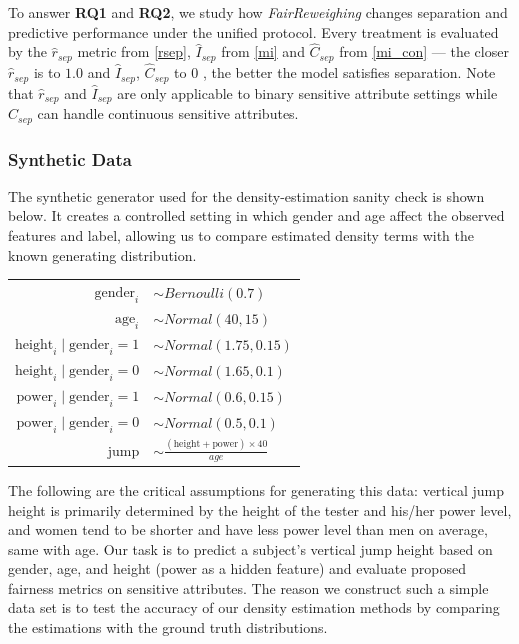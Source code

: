 To answer \textbf{RQ1} and \textbf{RQ2}, we study how \emph{FairReweighing} changes separation and predictive performance under the unified protocol. Every treatment is evaluated by the $\hat{r}_{sep}$ metric from \eqref{rsep}, $\hat{I}_{sep}$ from \eqref{mi} and $\hat{C}_{sep}$ from \eqref{mi_con} --- the closer $\hat{r}_{sep}$ is to $1.0$ and $\hat{I}_{sep}$, $\hat{C}_{sep}$ to $0$ , the better the model satisfies separation. Note that $\hat{r}_{sep}$ and $\hat{I}_{sep}$ are only applicable to binary sensitive attribute settings while $\hat{C}_{sep}$ can handle continuous sensitive attributes.

\subsubsection{Synthetic Data}
The synthetic generator used for the density-estimation sanity check is shown below. It creates a controlled setting in which gender and age affect the observed features and label, allowing us to compare estimated density terms with the known generating distribution.
\vspace{0.2cm} 
\begin{tabular}{rl}
$\text{gender}_i$ &$\sim  Bernoulli(0.7)$ \\
$\text{age}_i$ &$\sim  Normal(40,15)$ \\

$\text{height}_i \mid \text{gender}_i = 1$ & $\sim Normal(1.75, 0.15)$ \\
$\text{height}_i \mid \text{gender}_i = 0$ &$\sim Normal(1.65, 0.1)$ \\
$\text{power}_i \mid \text{gender}_i = 1$ &$\sim Normal(0.6, 0.15)$ \\
$\text{power}_i \mid \text{gender}_i = 0$ &$\sim Normal(0.5, 0.1)$ \\
$\text{jump}$ &$\sim \frac{(\text{height}+\text{power}) \times 40}{age}$
\end{tabular}

\vspace{0.2cm} 

The following are the critical assumptions for generating this data: vertical jump height is primarily determined by the height of the tester and his/her power level, and women tend to be shorter and have less power level than men on average, same with age. Our task is to predict a subject's vertical jump height based on gender, age, and height (power as a hidden feature) and evaluate proposed fairness metrics on sensitive attributes. The reason we construct such a simple data set is to test the accuracy of our density estimation methods by comparing the estimations with the ground truth distributions.

